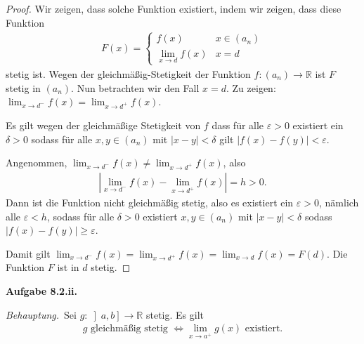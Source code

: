 \documentclass[12pt]{extarticle}
\newcommand{\beh}{\textit{Behauptung.}\ }
\newcommand{\aufgn}[1]{\textbf{Aufgabe #1.}}
\newcommand{\mg}[1]{\mathbb{#1}}
\begin{document}
\begin{proof}
Wir zeigen, dass solche Funktion existiert, indem wir
zeigen, dass diese Funktion
\begin{align*}
  F(x) =
\begin{cases}
  f(x) & x \in (a_n) \\
  \lim_{x \to d}{f(x)} & x = d
\end{cases}
\end{align*} stetig ist.
Wegen der gleichmäßig-Stetigkeit der Funktion $f \colon
(a_n) \to \mg{R}$ ist \(F\) stetig in \((a_n)\).  Nun
betrachten wir den Fall \(x = d\).  Zu zeigen: $\lim_{x
  \to d^-}{f(x)} = \lim_{x \to d^+}{f(x)}$.

Es gilt wegen der gleichmäßige Stetigkeit von \(f\) dass
für alle \(\varepsilon > 0\) existiert ein \(\delta > 0\)
sodass für alle \(x, y \in (a_n)\) mit
\(\left| x - y \right| < \delta\) gilt
\(\left| f(x) - f(y) \right| < \varepsilon\).

Angenommen,
\(\lim_{x \to d^-}{f(x)} \ne \lim_{x \to d^+}{f(x)}\), also
\begin{align*}
  \left| \lim_{x \to d^-}{f(x)} - \lim_{x \to d^+}{f(x)}
  \right| = h > 0.
\end{align*}
Dann ist die Funktion nicht gleichmäßig stetig, also es
existiert ein \(\varepsilon > 0\), nämlich alle
\(\varepsilon < h\), sodass für alle \(\delta > 0\)
existiert \(x, y \in (a_n)\) mit
\(\left| x - y \right| < \delta\) sodass
\(\left| f(x) - f(y) \right| \ge \varepsilon\).

Damit gilt
$\lim_{x \to d^-}{f(x)} = \lim_{x \to d^+}{f(x)} =
\lim_{x \to d}{f(x)}=F(d)$.  Die Funktion \(F\) ist in
\(d\) stetig.
\end{proof}


\aufgn{8.2.ii}

\beh Sei \(g \colon \left] a, b \right] \to \mg{R}\) stetig.  Es gilt
\begin{align*}
g \text{ gleichmäßig stetig } \iff \lim_{x \to
  a^+}{g(x)} \text{ existiert.}
\end{align*}
\end{document}

